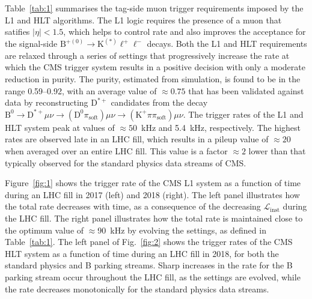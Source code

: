 \documentclass{webofc}
\newcommand{\ellell}{\ensuremath{\ell^+\ell^-}\xspace}
\newcommand{\btokstar}{\ensuremath{\textrm{B}^{+(0)}{\rightarrow}\textrm{K}^{(*)}}\xspace}
\newcommand{\btokstarll}{\ensuremath{\btokstar\ellell}\xspace}
\newcommand{\instlumi}{\ensuremath{\mathcal{L}_{\textrm{inst}}}\xspace}
\begin{document}
Table~\ref{tab:1} summarises the tag-side muon trigger requirements
imposed by the L1 and HLT algorithms. The L1 logic requires the
presence of a muon that satifies $|\eta| < 1.5$, which helps to
control rate and also improves the acceptance for the signal-side
\btokstarll decays. Both the L1 and HLT requirements are relaxed
through a series of settings that progressively increase the rate at
which the CMS trigger system results in a positive decision with only
a moderate reduction in purity. The purity, estimated from simulation,
is found to be in the range 0.59--0.92, with an average value of
${\approx}0.75$ that has been validated against data by reconstructing
$\textrm{D}^{*+}$ candidates from the decay $\textrm{B}^0
{\rightarrow} \textrm{D}^{*+}\mu\nu {\rightarrow}
(\textrm{D}^{0}\pi_{\textrm{soft}})\mu\nu {\rightarrow}
(\textrm{K}^+\pi\pi_{\textrm{soft}})\mu\nu$. The trigger rates of the
L1 and HLT system peak at values of ${\approx}50$~kHz and 5.4~kHz,
respectively. The highest rates are observed late in an LHC fill,
which results in a pileup value of ${\approx}20$ when averaged over an
entire LHC fill. This value is a factor ${\approx}2$ lower than that
typically observed for the standard physics data streams of CMS.

Figure~\ref{fig:1} shows the trigger rate of the CMS L1 system as a
function of time during an LHC fill in 2017 (left) and 2018 (right).
The left panel illustrates how the total rate decreases with time, as
a consequence of the decreasing \instlumi during the LHC fill. The
right panel illustrates how the total rate is maintained close to the
optimum value of ${\approx}$90~kHz by evolving the settings, as
defined in Table~\ref{tab:1}. The left panel of Fig.~\ref{fig:2} shows
the trigger rates of the CMS HLT system as a function of time during
an LHC fill in 2018, for both the standard physics and B parking
streams. Sharp increases in the rate for the B parking stream occur
throughout the LHC fill, as the settings are evolved, while the rate
decreases monotonically for the standard physics data streams.
\end{document}
